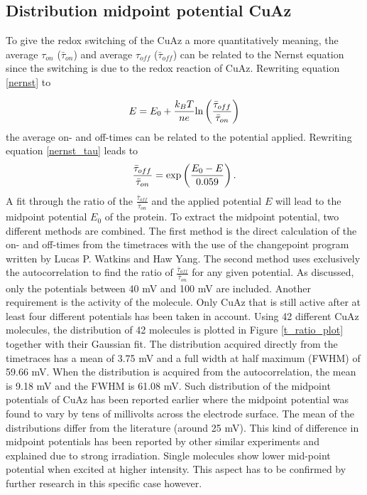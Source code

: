 \documentclass[twoside,single]{lion-msc}
\begin{document}
\subsection{Distribution midpoint potential CuAz}
To give the redox switching of the CuAz a more quantitatively meaning, the average $\tau_{on}$ ($\bar{\tau}_{on}$) and average $\tau_{off}$ ($\bar{\tau}_{off}$) can be related to the Nernst equation since the switching is due to the redox reaction of CuAz. Rewriting equation \ref{nernst} to 

\begin{equation}\label{nernst_tau}
E = E_{0}+\frac{k_{B}T}{ne}\textup{ln}\left ( \frac{\bar{\tau}_{off}}{\bar{\tau}_{on}} \right )
\end{equation}
the average on- and off-times can be related to the potential applied. Rewriting equation \ref{nernst_tau} leads to
\begin{equation}\label{fit_onoff}
\frac{\bar{\tau}_{off}}{\bar{\tau}_{on}} = \textup{exp}\left ( \frac{E_{0}-E}{0.059} \right ).
\end{equation}
A fit through the ratio of the $\frac{\bar{\tau}_{off}}{\bar{\tau}_{on}}$ and the applied potential $E$ will lead to the midpoint potential $E_{0}$ of the protein. To extract the midpoint potential, two different methods are combined. The first method is the direct calculation of the on- and off-times from the timetraces with the use of the changepoint program written by  Lucas P. Watkins and Haw Yang. The second method uses exclusively the autocorrelation to find the ratio of  $\frac{\bar{\tau}_{off}}{\bar{\tau}_{on}}$ for any given potential. As discussed, only the potentials between 40 mV and 100 mV are included. Another requirement is the activity of the molecule. Only CuAz that is still active after at least four different potentials has been taken in account. Using 42 different CuAz molecules, the distribution of 42 molecules is plotted in Figure \ref{t_ratio_plot} together with their Gaussian fit. The distribution acquired directly from the timetraces has a mean of 3.75 mV and a full width at half maximum (FWHM) of 59.66 mV. When the distribution is acquired from the autocorrelation, the mean is 9.18 mV and the FWHM is 61.08 mV. Such distribution of the midpoint potentials of CuAz has been reported earlier \cite{Salverda2010} where the midpoint potential was found to vary by tens of millivolts across the electrode surface. The mean of the distributions differ from the literature (around 25 mV). This kind of difference in midpoint potentials has been reported by other similar experiments \cite{Zhang2017} and explained due to strong irradiation. Single molecules show lower mid-point potential when excited at higher intensity. This aspect has to be confirmed by further research in this specific case however. 
\end{document}
